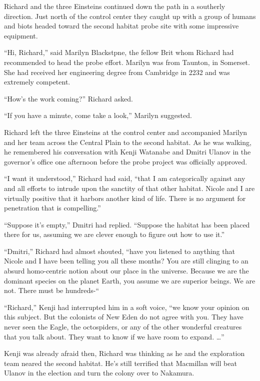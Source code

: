 \documentclass[]{article}
\begin{document}
{Richard and the three Einsteins continued down the path in a southerly direction. Just north of the control center they caught up with a group of humans and biots headed toward the second habitat probe site with some impressive equipment.

“Hi, Richard,” said Marilyn Blackstpne, the fellow Brit whom Richard had recommended to head the probe effort. Marilyn was from Taunton, in Somerset. She had received her engineering degree from Cambridge in 2232 and was extremely competent.

“How’s the work coming?” Richard asked.

“If you have a minute, come take a look,” Marilyn suggested.

Richard left the three Einsteins at the control center and accompanied Marilyn and her team across the Central Plain to the second habitat. As he was walking, he remembered his conversation with Kenji Watanabe and Dmitri Ulanov in the governor’s office one afternoon before the probe project was officially approved.

“I want it understood,” Richard had said, “that I am categorically against any and all efforts to intrude upon the sanctity of that other habitat. Nicole and I are virtually positive that it harbors another kind of life. There is no argument for penetration that is compelling.”

“Suppose it’s empty,” Dmitri had replied. “Suppose the habitat has been placed there for us, assuming we are clever enough to figure out how to use it.”

“Dmitri,” Richard had almost shouted, “have you listened to anything that Nicole and I have been telling you all these months? You are still clinging to an absurd homo-centric notion about our place in the universe. Because we are the dominant species on the planet Earth, you assume we are superior beings. We are not. There must be hundreds-“

“Richard,” Kenji had interrupted him in a soft voice, “we know your opinion on this subject. But the colonists of New Eden do not agree with you. They have never seen the Eagle, the octospiders, or any of the other wonderful creatures that you talk about. They want to know if we have room to expand. …”

Kenji was already afraid then, Richard was thinking as he and the exploration team neared the second habitat. He’s still terrified that Macmillan will beat Ulanov in the election and turn the colony over to Nakamura.

}
\end{document}
